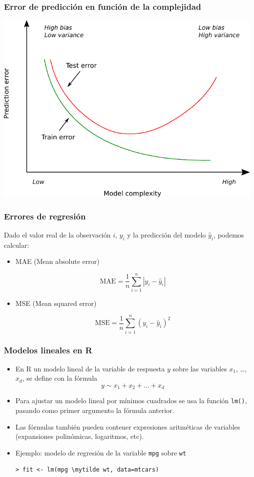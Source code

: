 \documentclass{beamer}
\newcommand{\mytilde}{$\sim$}
\begin{document}
\begin{frame}
\frametitle{Error de predicción en función de la complejidad}
\centering
\includegraphics[height=0.75\textheight]{biasvariance.pdf}
\end{frame}


\begin{frame}
\frametitle{Errores de regresión}

Dado el valor real de la observación $i$, $y_i$ y la predicción del modelo $\hat{y}_i$, podemos calcular:

\begin{itemize}
\item MAE (Mean absolute error)

$$\text{MAE} = \frac{1}{n}\sum_{i=1}^{n}{|y_i - \hat{y}_i|}$$

\item MSE (Mean squared error)

$$\text{MSE} = \frac{1}{n}\sum_{i=1}^{n}{(y_i - \hat{y}_i)^2}$$

\end{itemize}
\end{frame}



\begin{frame}[fragile]
\frametitle{Modelos lineales en R}
\begin{itemize}
\item En R un modelo lineal de la variable de respuesta $y$ sobre las variables $x_1$, \dots, $x_d$, se define con la fórmula $$y \sim x_1 + x_2 + \dots + x_d$$
\item Para ajustar un modelo lineal por mínimos cuadrados se usa la función \texttt{lm()}, pasando como primer argumento la fórmula anterior.
\item Las fórmulas también pueden contener expresiones aritméticas de variables (expansiones polinómicas, logaritmos, etc).
\item Ejemplo: modelo de regresión de la variable \texttt{mpg} sobre \texttt{wt}

\begin{Verbatim}[commandchars=\\\{\}]
   > fit <- lm(mpg \mytilde wt, data=mtcars)
\end{Verbatim}
\end{itemize}
\end{frame}
\end{document}
